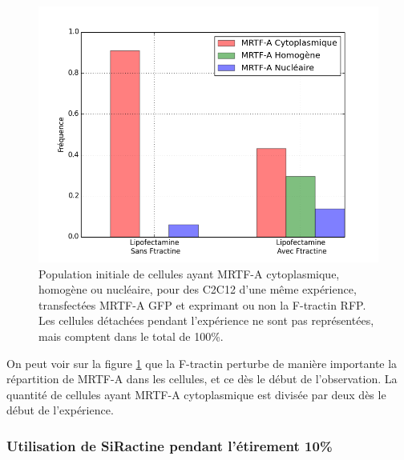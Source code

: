 \begin{figure}
\includegraphics[scale=0.4]{Figures/Ftractine.png} 
\caption{Population initiale de cellules ayant MRTF-A cytoplasmique, homogène ou nucléaire, pour des C2C12 d'une même expérience, transfectées MRTF-A GFP et exprimant ou non la F-tractin RFP. Les cellules détachées pendant l'expérience ne sont pas représentées, mais comptent dans le total de 100\%. \label{Ftractin}}
\end{figure}

On peut voir sur la figure \ref{Ftractin} que la F-tractin perturbe de manière importante la répartition de MRTF-A dans les cellules, et ce dès le début de l'observation. 
La quantité de cellules ayant MRTF-A cytoplasmique est divisée par deux dès le début de l'expérience. 


\subsubsection{Utilisation de SiRactine pendant l'étirement 10\%}

